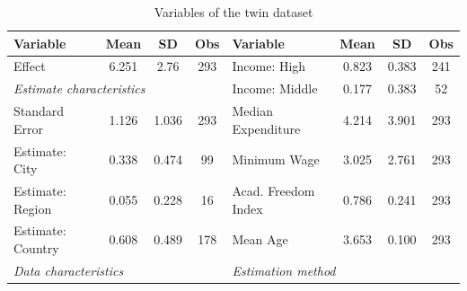 \begin{table}[!htbp]
  \centering
  \scriptsize
  \singlespace
  \caption{Variables of the twin dataset}
  \label{tab:twins_new_vars}
  \begin{tabular}
    {
      @{\hskip\tabcolsep\extracolsep}
      l
      *{3}{c}
      |
      l
        *{3}{c}
      @{}
    }
    \toprule
    Variable                                                                & Mean   & SD                                                           & Obs   & Variable                                                               & Mean   & SD    & Obs \\
    \midrule
    Effect                                                                  & 6.251  & 2.76                                                         & 293   & Income: High                                                           & 0.823  & 0.383 & 241 \\
    \multicolumn{3}{l}{\textit{\hspace{0.1cm}Estimate characteristics}}     &        & Income: Middle                                               & 0.177 & 0.383                                                                  & 52                   \\
    Standard Error                                                          & 1.126  & 1.036                                                        & 293   & Median Expenditure                                                     & 4.214  & 3.901 & 293 \\
    Estimate: City                                                          & 0.338  & 0.474                                                        & 99    & Minimum Wage                                                           & 3.025  & 2.761 & 293 \\
    Estimate: Region                                                        & 0.055  & 0.228                                                        & 16    & Acad. Freedom Index                                                    & 0.786  & 0.241 & 293 \\
    Estimate: Country                                                       & 0.608  & 0.489                                                        & 178   & Mean Age                                                               & 3.653  & 0.100 & 293 \\
    \multicolumn{3}{l}{\textit{\hspace{0.1cm}Data characteristics}}         &        & \multicolumn{3}{l}{\textit{\hspace{0.1cm}Estimation method}} &                                                                                                       \\

\end{tabular}
\end{table}
